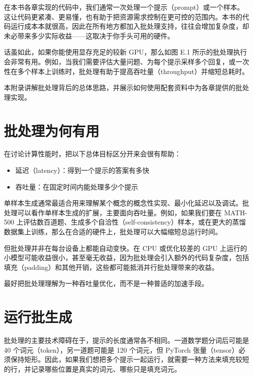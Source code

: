 在本书各章实现的代码中，我们通常一次处理一个提示（prompt）或一个样本。这让代码更紧凑、更易懂，也有助于把资源需求控制在更可控的范围内。本书的代码运行成本本就很高，因此在所有地方都加入批处理支持，往往会增加复杂度，却未必带来多少实际收益——这取决于你手头可用的硬件。

话虽如此，如果你能使用显存充足的较新 GPU，那么如图 E.1 所示的批处理执行会非常有用。例如，当我们需要评估大量问题、为每个提示采样多个回复，或一次性在多个样本上训练时，批处理有助于提高吞吐量（throughput）并缩短总耗时。


本附录讲解批处理背后的总体思路，并展示如何使用配套资料中为各章提供的批处理实现。

\section{批处理为何有用}

在讨论计算性能时，把以下总体目标区分开来会很有帮助：

\begin{itemize}
\item 延迟（latency）：得到一个提示的答案有多快
\item 吞吐量：在固定时间内能处理多少个提示
\end{itemize}

单样本生成通常最适合用来理解某个概念的概念性实现、最小化延迟以及调试。批处理可以看作单样本生成的扩展，主要面向吞吐量。例如，如果我们要在 MATH-500 上评估数百道题、生成多个自洽性（self-consistency）样本，或在更大的蒸馏数据集上训练，那么在合适的硬件上，批处理可以大幅缩短总运行时间。

但批处理并非在每台设备上都能自动变快。在 CPU 或优化较差的 GPU 上运行的小模型可能收益很小，甚至毫无收益，因为批处理会引入额外的代码复杂度，包括填充（padding）和其他开销，这些都可能抵消并行批处理带来的收益。

最好把批处理理解为一种吞吐量优化，而不是一种普适的加速手段。

\section{运行批生成}

批处理的主要技术障碍在于，提示的长度通常各不相同。一道数学题分词后可能是 40 个词元（token），另一道题可能是 120 个词元，但 PyTorch 张量（tensor）必须保持矩形。因此，如果我们想把多个提示一起运行，就需要一种方法来填充较短的行，并记录哪些位置是真实的词元、哪些只是填充词元。

